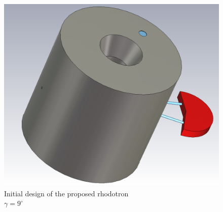 \documentclass[a4paper,oneside,12pt]{report}
\numberwithin{equation}{chapter}
\begin{document}
\begin{figure}[H]
    \centering
    \captionsetup{justification=centering}
    \includegraphics[width=.5\linewidth]{./figures/cst/cst_first_design1.png}
    \caption{Initial design of the proposed rhodotron \\ $\gamma=9^\circ$}
    \label{fig:initial_design}
\end{figure}
\end{document}
